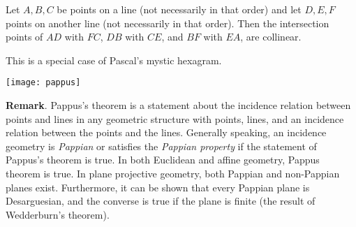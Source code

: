 \documentclass[12pt]{article}
\begin{document}
Let $A,B,C$ be points on a line (not necessarily in that order) and let $D,E,F$ points on another line (not necessarily in that order). Then the intersection points of $AD$ with $FC$, $DB$ with $CE$, and $BF$ with $EA$, are collinear.

This is a special case of Pascal's mystic hexagram.
\begin{center}
\texttt{[image: pappus]}
\end{center}

\textbf{Remark}.  Pappus's theorem is a statement about the incidence relation between points and lines in any geometric structure with points, lines, and an incidence relation between the points and the lines.  Generally speaking, an incidence geometry is \emph{Pappian} or satisfies the \emph{Pappian property} if the statement of Pappus's theorem is true.  In both Euclidean and affine geometry, Pappus theorem is true.  In plane projective geometry, both Pappian and non-Pappian planes exist.  Furthermore, it can be shown that every Pappian plane is Desarguesian, and the converse is true if the plane is finite (the result of Wedderburn's theorem).
\end{document}
